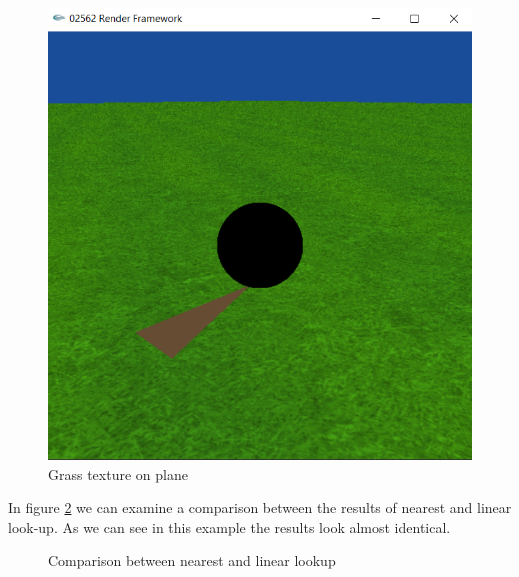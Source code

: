 \begin{figure}[H]
	\centering
	\includegraphics[scale=\imagescale]{images/worksheet_3/part_4}
	\caption{Grass texture on plane}
	\label{fig:texture_plane}
\end{figure}
In figure \ref{fig:lookup_comparison} we can examine a comparison between the results of nearest and linear look-up. As we can see in this example the results look almost identical.
\begin{figure}[H]
	\centering
	\qquad
	\caption{Comparison between nearest and linear lookup}%
	\label{fig:lookup_comparison}%
\end{figure}

